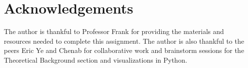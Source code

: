 \documentclass[11pt]{amsart}
\begin{document}
\section*{Acknowledgements}

The author is thankful to Professor Frank for providing the materials and resources needed to complete this assignment. The author is also thankful to the peers Eric Ye and Chenab for collaborative work and brainstorm sessions for the Theoretical Background section and visualizations in Python.



\end{document}
